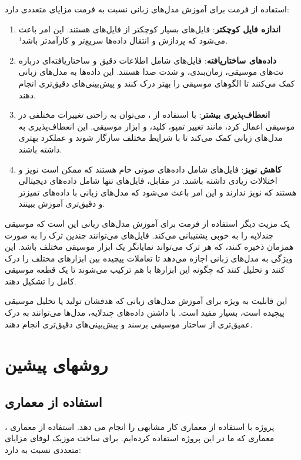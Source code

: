 استفاده از فرمت  برای آموزش مدل‌های زبانی نسبت به فرمت  مزایای
متعددی دارد:

\begin{enumerate}
  \def\labelenumi{\arabic{enumi}.}
  \item
        \textbf{اندازه فایل کوچکتر}: فایل‌های  بسیار کوچکتر از فایل‌های 
        هستند. این امر باعث می‌شود که پردازش و انتقال داده‌ها سریع‌تر و کارآمدتر
        باشد¹.
  \item
        \textbf{داده‌های ساختاریافته}: فایل‌های  شامل اطلاعات دقیق و
        ساختاریافته‌ای درباره نت‌های موسیقی، زمان‌بندی، و شدت صدا هستند. این
        داده‌ها به مدل‌های زبانی کمک می‌کنند تا الگوهای موسیقی را بهتر درک کنند و
        پیش‌بینی‌های دقیق‌تری انجام دهند.
  \item
        \textbf{انعطاف‌پذیری بیشتر}: با استفاده از ، می‌توان به راحتی
        تغییرات مختلفی در موسیقی اعمال کرد، مانند تغییر تمپو، کلید، و ابزار
        موسیقی. این انعطاف‌پذیری به مدل‌های زبانی کمک می‌کند تا با شرایط مختلف
        سازگار شوند و عملکرد بهتری داشته باشند.
  \item
        \textbf{کاهش نویز}: فایل‌های  شامل داده‌های صوتی خام هستند که ممکن
        است نویز و اختلالات زیادی داشته باشند. در مقابل، فایل‌های  تنها
        شامل داده‌های دیجیتالی هستند که نویز ندارند و این امر باعث می‌شود که
        مدل‌های زبانی با داده‌های تمیزتر و دقیق‌تری آموزش ببینند.
\end{enumerate}

یک مزیت دیگر استفاده از فرمت  برای آموزش مدل‌های زبانی این است که موسیقی چندلایه را به خوبی پشتیبانی می‌کند. فایل‌های  می‌توانند چندین ترک  را به صورت همزمان ذخیره کنند، که هر ترک می‌تواند نمایانگر یک ابزار موسیقی مختلف باشد. این ویژگی به مدل‌های زبانی اجازه می‌دهد تا تعاملات پیچیده بین ابزارهای مختلف را درک کنند و تحلیل کنند که چگونه این ابزارها با هم ترکیب می‌شوند تا یک قطعه موسیقی کامل را تشکیل دهند.

این قابلیت به ویژه برای آموزش مدل‌های زبانی که هدفشان تولید یا تحلیل موسیقی پیچیده است، بسیار مفید است. با داشتن داده‌های چندلایه، مدل‌ها می‌توانند به درک عمیق‌تری از ساختار موسیقی برسند و پیش‌بینی‌های دقیق‌تری انجام دهند.

\section{روشهای پيشين}
\subsection{استفاده از معماری }
پروژه  \cite{Zhang} با استفاده از معماری  کار مشابهی را انجام می دهد.
استفاده از معماری ، معماری که ما در این پروژه استفاده کرده‌ایم. برای ساخت موزیک
لوفای  مزایای متعددی نسبت به   دارد:

